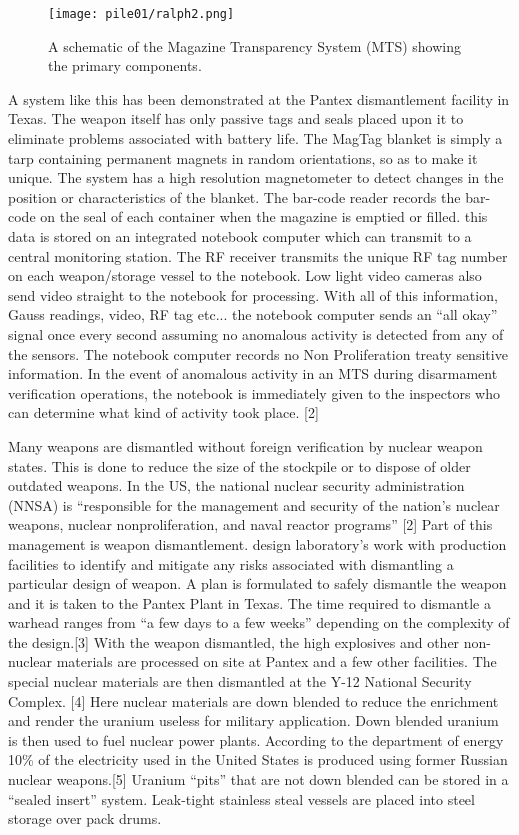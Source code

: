 \documentclass[twocolumn,a4paper]{article}
\begin{document}
\begin{figure}
  \texttt{[image: pile01/ralph2.png]}
  \caption{A schematic of the Magazine Transparency System (MTS) 
    showing the primary components.}
\end{figure}

A system like this has been demonstrated at the Pantex dismantlement
facility in Texas. The weapon itself has only passive tags and seals
placed upon it to eliminate problems associated with battery life. The
MagTag blanket is simply a tarp containing permanent magnets in random
orientations, so as to make it unique. The system has a high
resolution magnetometer to detect changes in the position or
characteristics of the blanket. The bar-code reader records the
bar-code on the seal of each container when the magazine is emptied or
filled. this data is stored on an integrated notebook computer which
can transmit to a central monitoring station. The RF receiver
transmits the unique RF tag number on each weapon/storage vessel to
the notebook. Low light video cameras also send video straight to the
notebook for processing. With all of this information, Gauss readings,
video, RF tag etc... the notebook computer sends an ``all okay'' signal
once every second assuming no anomalous activity is detected from any
of the sensors. The notebook computer records no Non Proliferation
treaty sensitive information.  In the event of anomalous activity in
an MTS during disarmament verification operations, the notebook is
immediately given to the inspectors who can determine what kind of
activity took place. [2]

Many weapons are dismantled without foreign verification by nuclear
weapon states.  This is done to reduce the size of the stockpile or to
dispose of older outdated weapons.  In the US, the national nuclear
security administration (NNSA) is ``responsible for the management and
security of the nation's nuclear weapons, nuclear nonproliferation,
and naval reactor programs'' [2] Part of this management is weapon
dismantlement. design laboratory's work with production facilities to
identify and mitigate any risks associated with dismantling a
particular design of weapon. A plan is formulated to safely dismantle
the weapon and it is taken to the Pantex Plant in Texas. The time
required to dismantle a warhead ranges from ``a few days to a few
weeks'' depending on the complexity of the design.[3] With the weapon
dismantled, the high explosives and other non-nuclear materials are
processed on site at Pantex and a few other facilities.  The special
nuclear materials are then dismantled at the Y-12 National Security
Complex.  [4] Here nuclear materials are down blended to reduce the
enrichment and render the uranium useless for military
application. Down blended uranium is then used to fuel nuclear power
plants. According to the department of energy 10\% of the electricity
used in the United States is produced using former Russian nuclear
weapons.[5] Uranium ``pits'' that are not down blended can be stored
in a ``sealed insert'' system. Leak-tight stainless steal vessels are
placed into steel storage over pack drums.
\end{document}
